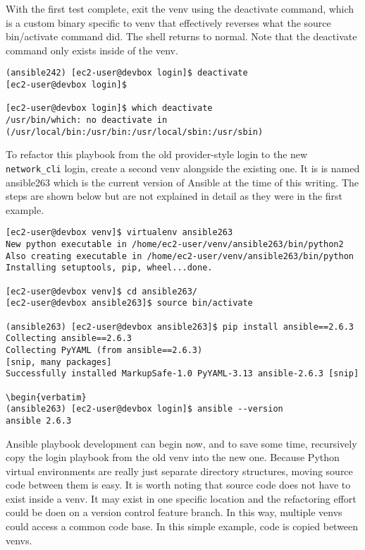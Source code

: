 With the first test complete, exit the venv using the deactivate command,
which is a custom binary specific to venv that effectively reverses what the
source bin/activate command did. The shell returns to normal. Note that the
deactivate command only exists inside of the venv.

\begin{verbatim}
(ansible242) [ec2-user@devbox login]$ deactivate
[ec2-user@devbox login]$

[ec2-user@devbox login]$ which deactivate
/usr/bin/which: no deactivate in (/usr/local/bin:/usr/bin:/usr/local/sbin:/usr/sbin)
\end{verbatim}

To refactor this playbook from the old provider-style login to the new
\verb|network_cli| login, create a second venv alongside the existing one. It is
is named ansible263 which is the current version of Ansible at the time of
this writing. The steps are shown below but are not explained in detail as
they were in the first example.

\begin{verbatim}
[ec2-user@devbox venv]$ virtualenv ansible263
New python executable in /home/ec2-user/venv/ansible263/bin/python2
Also creating executable in /home/ec2-user/venv/ansible263/bin/python
Installing setuptools, pip, wheel...done.

[ec2-user@devbox venv]$ cd ansible263/
[ec2-user@devbox ansible263]$ source bin/activate

(ansible263) [ec2-user@devbox ansible263]$ pip install ansible==2.6.3
Collecting ansible==2.6.3
Collecting PyYAML (from ansible==2.6.3)
[snip, many packages]
Successfully installed MarkupSafe-1.0 PyYAML-3.13 ansible-2.6.3 [snip]

\begin{verbatim}
(ansible263) [ec2-user@devbox login]$ ansible --version
ansible 2.6.3
\end{verbatim}

Ansible playbook development can begin now, and to save some time, recursively
copy the login playbook from the old venv into the new one. Because Python
virtual environments are really just separate directory structures, moving
source code between them is easy. It is worth noting that source code does not
have to exist inside a venv. It may exist in one specific location and the
refactoring effort could be doen on a version control feature branch. In this
way, multiple venvs could access a common code base. In this simple example,
code is copied between venvs.

